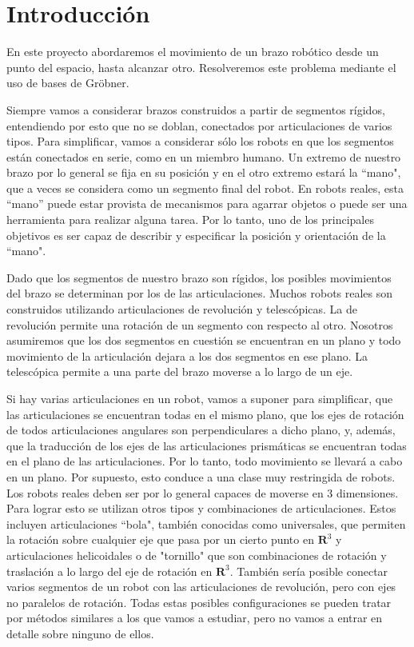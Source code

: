 \chapter{Introducción}

En este proyecto abordaremos el movimiento de un brazo robótico desde un punto del espacio, hasta alcanzar otro. Resolveremos este problema mediante el uso de bases de Gröbner.

Siempre vamos a considerar brazos construidos a partir de segmentos rígidos, entendiendo por esto que no se doblan, conectados por articulaciones de varios tipos. Para simplificar, vamos a considerar sólo los robots en que los segmentos están conectados en serie, como en un miembro humano. Un extremo de nuestro brazo por lo general se fija en su posición y en el otro extremo estará la ``mano", que a veces se considera como un segmento final del robot. En robots reales, esta ``mano'' puede estar provista de mecanismos para agarrar objetos o puede ser una herramienta para realizar alguna tarea. Por lo tanto, uno de los principales objetivos es ser capaz de describir y especificar la posición y orientación de la ``mano".

Dado que los segmentos de nuestro brazo son rígidos, los posibles movimientos del brazo se determinan por los de las articulaciones. Muchos robots reales son construidos utilizando articulaciones de revolución y telescópicas. 
La de revolución permite una rotación de un segmento con respecto al otro. Nosotros asumiremos que los dos segmentos en cuestión se encuentran en un plano y todo movimiento de la articulación dejara a los dos segmentos en ese plano.
La telescópica permite a una parte del brazo moverse a lo largo de un eje.

Si hay varias articulaciones en un robot, vamos a suponer para simplificar, que las articulaciones se encuentran todas en el mismo plano, que los ejes de rotación de todos articulaciones angulares son perpendiculares a dicho plano, y, además, que la traducción de los ejes de las articulaciones prismáticas se encuentran todas en el plano de las articulaciones. Por lo tanto, todo movimiento se llevará a cabo en un plano. Por supuesto, esto conduce a una clase muy restringida de robots. Los robots reales deben ser por lo general capaces de moverse en 3 dimensiones. Para lograr esto se utilizan otros tipos y combinaciones de articulaciones. Estos incluyen articulaciones ``bola", también conocidas como universales, que permiten la rotación sobre cualquier eje que pasa por un cierto punto en $\mathbf{R}^{3}$ y articulaciones  helicoidales o de "tornillo" que son combinaciones de rotación y traslación a lo largo del eje de rotación en $\mathbf{R}^{3}$. También sería posible conectar varios segmentos de un robot con las articulaciones de revolución, pero con ejes no paralelos de rotación. Todas estas posibles configuraciones se pueden tratar por métodos similares a los que vamos a estudiar, pero no vamos a entrar en detalle sobre ninguno de ellos.

